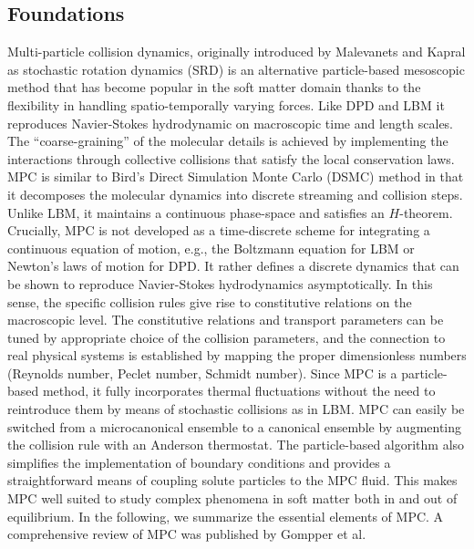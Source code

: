 \documentclass[8.5pt,twoside,twocolumn]{article}
\begin{document}
\subsection{Foundations}

Multi-particle collision dynamics, originally introduced by Malevanets and Kapral\cite{Malevanets:1999,Malevanets:2001,Gompper:2009} as stochastic rotation dynamics (SRD) is an alternative particle-based mesoscopic method that has become popular in the soft matter domain thanks to the flexibility in handling spatio-temporally varying forces. Like DPD and LBM it reproduces Navier-Stokes hydrodynamic on macroscopic time and length scales. The ``coarse-graining'' of the molecular details is achieved by implementing the interactions through collective collisions that satisfy the local conservation laws. MPC is similar to Bird's Direct Simulation Monte Carlo (DSMC) method \cite{Bird:1994} in that it decomposes the molecular dynamics into discrete streaming and collision steps. Unlike LBM, it maintains a continuous phase-space and satisfies an $H$-theorem.\cite{Malevanets:1999,Ihle:2003} Crucially, MPC is not developed as a time-discrete scheme for integrating a continuous equation of motion, e.g., the Boltzmann equation for LBM or Newton's laws of motion for DPD. It rather defines a discrete dynamics that can be shown to reproduce Navier-Stokes hydrodynamics asymptotically. In this sense, the specific collision rules give rise to constitutive relations on the macroscopic level. The constitutive relations and transport parameters can be tuned by appropriate choice of the collision parameters, and the connection to real physical systems is established by mapping the proper dimensionless numbers (Reynolds number, Peclet number, Schmidt number).\cite{Padding:2006} Since MPC is a particle-based method, it fully incorporates thermal fluctuations without the need to reintroduce them by means of stochastic collisions as in LBM.\cite{Ladd:1994a,Adhikari:2005,Duenweg:2007,Duenweg:2008a,Gross:2010} MPC can easily be switched from a microcanonical ensemble to a canonical ensemble by augmenting the collision rule with an Anderson thermostat. The particle-based algorithm also simplifies the implementation of boundary conditions and provides a straightforward means of coupling solute particles to the MPC fluid. This makes MPC well suited to study complex phenomena in soft matter both in and out of equilibrium.
%
In the following, we summarize the essential elements of MPC. A comprehensive review of MPC was published by Gompper et al.\cite{Gompper:2009}
\end{document}
